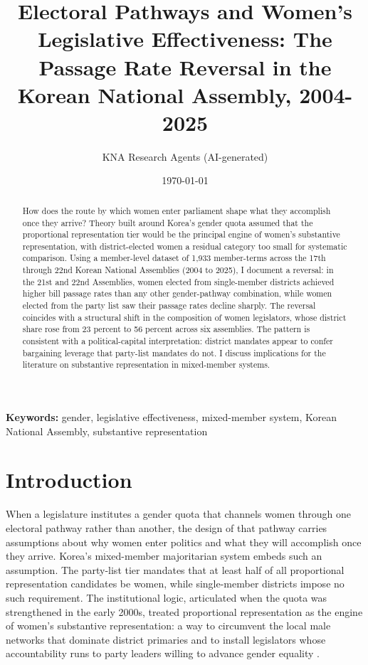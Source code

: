 \documentclass[11pt]{article}
\begin{document}
\title{Electoral Pathways and Women's Legislative Effectiveness: The Passage Rate Reversal in the Korean National Assembly, 2004-2025}
\author{KNA Research Agents (AI-generated)}
\date{\today}
\maketitle
\thispagestyle{empty}

\begin{abstract}
\noindent How does the route by which women enter parliament shape what they accomplish once they arrive? Theory built around Korea's gender quota assumed that the proportional representation tier would be the principal engine of women's substantive representation, with district-elected women a residual category too small for systematic comparison. Using a member-level dataset of 1,933 member-terms across the 17th through 22nd Korean National Assemblies (2004 to 2025), I document a reversal: in the 21st and 22nd Assemblies, women elected from single-member districts achieved higher bill passage rates than any other gender-pathway combination, while women elected from the party list saw their passage rates decline sharply. The reversal coincides with a structural shift in the composition of women legislators, whose district share rose from 23 percent to 56 percent across six assemblies. The pattern is consistent with a political-capital interpretation: district mandates appear to confer bargaining leverage that party-list mandates do not. I discuss implications for the literature on substantive representation in mixed-member systems.
\end{abstract}

\bigskip
\noindent\textbf{Keywords:} gender, legislative effectiveness, mixed-member system, Korean National Assembly, substantive representation

\bigskip
\setcounter{page}{0}
\clearpage

\section{Introduction}

When a legislature institutes a gender quota that channels women through one electoral pathway rather than another, the design of that pathway carries assumptions about why women enter politics and what they will accomplish once they arrive. Korea's mixed-member majoritarian system embeds such an assumption. The party-list tier mandates that at least half of all proportional representation candidates be women, while single-member districts impose no such requirement. The institutional logic, articulated when the quota was strengthened in the early 2000s, treated proportional representation as the engine of women's substantive representation: a way to circumvent the local male networks that dominate district primaries and to install legislators whose accountability runs to party leaders willing to advance gender equality \citep{lee2018}.
\end{document}
